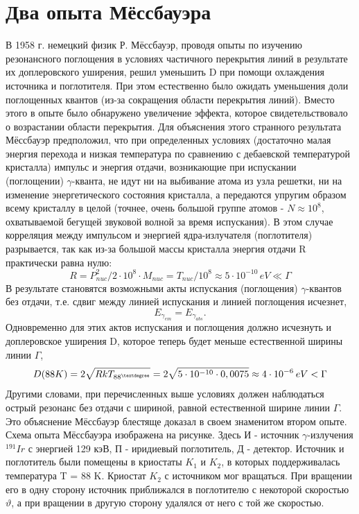 \documentclass{article}
\begin{document}
\section{Два опыта Мёссбауэра}
\hspace{12pt} В 1958 г. немецкий физик Р. Мёссбауэр, проводя опыты по изучению резонансного поглощения в условиях частичного перекрытия линий в результате их доплеровского уширения, решил уменьшить D при помощи охлаждения источника и поглотителя. При этом естественно было ожидать уменьшения доли поглощенных квантов (из-за сокращения области перекрытия линий). Вместо этого в опыте было обнаружено увеличение эффекта, которое свидетельствовало о возрастании области перекрытия.
\indent Для объяснения этого странного результата Мёссбауэр предположил, что при определенных условиях (достаточно малая энергия перехода и низкая температура по сравнению с дебаевской температурой кристалла) импульс и энергия отдачи, возникающие при испускании (поглощении) $\gamma$-кванта, не идут ни на выбивание атома из узла решетки, ни на изменение энергетического состояния кристалла, а передаются упругим образом всему кристаллу в целой (точнее, очень большой группе атомов - $N \approx 10^{8}$, охватываемой бегущей звуковой волной за время испускания). В этом случае корреляция между импульсом и энергией ядра-излучателя (поглотителя) разрывается, так как из-за большой массы кристалла энергия отдачи R практически равна нулю:
$$ R = P_{nuc}^{2}/2 \cdot 10^{8} \cdot M_{nuc} = T_{nuc}/10^{8} \approx 5 \cdot 10^{-10} \hspace{2pt} eV \ll \Gamma $$
\indent В результате становятся возможными акты испускания (поглощения) $\gamma$-квантов без отдачи, т.е. сдвиг между линией испускания и линией поглощения исчезнет,
$$ E_{\gamma_{em}} = E_{\gamma_{abs}} .$$
\indent Одновременно для этих актов испускания и поглощения должно исчезнуть и доплеровское уширения D, которое теперь будет меньше естественной ширины линии $\Gamma$,
$$ D(88K) = 2\sqrt{RkT_{88^{\textdegree}}} = 2\sqrt{5 \cdot 10^{-10} \cdot 0,0075} \approx 4 \cdot 10^{-6} \hspace{2pt}eV < \Gamma$$
\indent Другими словами, при перечисленных выше условиях должен наблюдаться острый резонанс без отдачи с шириной, равной естественной ширине линии $\Gamma$. Это объяснение Мёссбауэр блестяще доказал в своем знаменитом втором опыте.
\\
\indent Схема опыта Мёссбауэра изображена на рисунке. Здесь И - источник $\gamma$-излучения $^{191}Ir$ с энергией 129 кэВ, П - иридиевый поглотитель, Д - детектор. Источник и поглотитель были помещены в криостаты $K_1$ и $K_2$, в которых поддерживалась температура T = 88 K. Криостат $K_2$ с источником мог вращаться. При вращении его в одну сторону источник приближался в поглотителю с некоторой скоростью $\vartheta$, а при вращении в другую сторону удалялся от него с той же скоростью.
\end{document}
